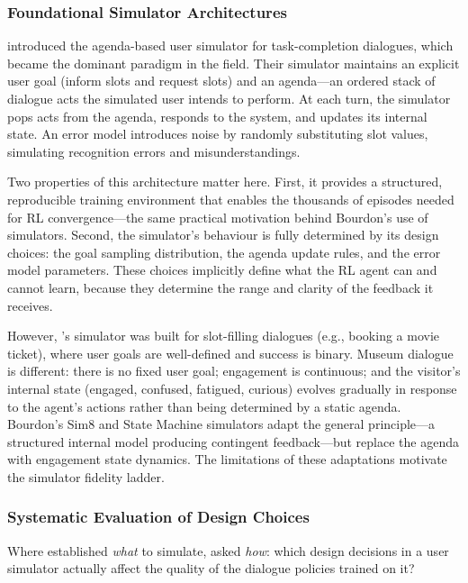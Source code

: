 \documentclass[a4paper, 11pt]{article}
\begin{document}
\subsubsection{Foundational Simulator Architectures}

\citet{li2016user} introduced the agenda-based user simulator for task-completion dialogues, which became the dominant paradigm in the field. Their simulator maintains an explicit user goal (inform slots and request slots) and an agenda---an ordered stack of dialogue acts the simulated user intends to perform. At each turn, the simulator pops acts from the agenda, responds to the system, and updates its internal state. An error model introduces noise by randomly substituting slot values, simulating recognition errors and misunderstandings.

Two properties of this architecture matter here. First, it provides a structured, reproducible training environment that enables the thousands of episodes needed for RL convergence---the same practical motivation behind Bourdon's use of simulators. Second, the simulator's behaviour is fully determined by its design choices: the goal sampling distribution, the agenda update rules, and the error model parameters. These choices implicitly define what the RL agent can and cannot learn, because they determine the range and clarity of the feedback it receives.

However, \citet{li2016user}'s simulator was built for slot-filling dialogues (e.g., booking a movie ticket), where user goals are well-defined and success is binary. Museum dialogue is different: there is no fixed user goal; engagement is continuous; and the visitor's internal state (engaged, confused, fatigued, curious) evolves gradually in response to the agent's actions rather than being determined by a static agenda. Bourdon's Sim8 and State Machine simulators adapt the general principle---a structured internal model producing contingent feedback---but replace the agenda with engagement state dynamics. The limitations of these adaptations motivate the simulator fidelity ladder.

\subsubsection{Systematic Evaluation of Design Choices}

Where \citet{li2016user} established \emph{what} to simulate, \citet{kreyssig2019neural} asked \emph{how}: which design decisions in a user simulator actually affect the quality of the dialogue policies trained on it?
\end{document}
